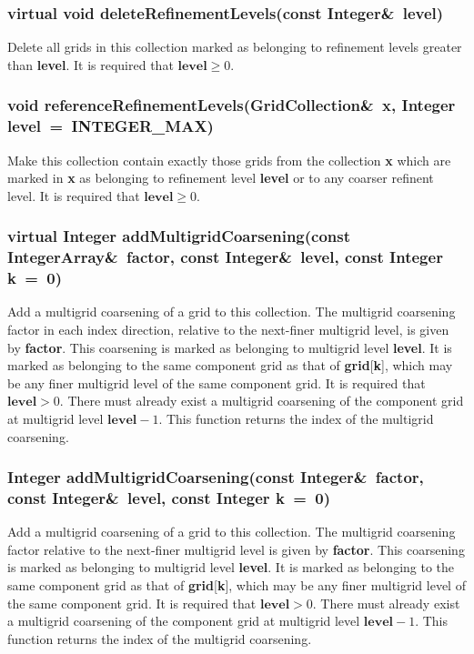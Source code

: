 \documentclass{article}
\begin{document}
  \subsubsection{virtual void deleteRefinementLevels(const Integer\&~level)}
  \label{GridCollection::deleteRefinementLevels(level)}
    Delete all grids in this collection marked as belonging to refinement levels greater than \textbf{level}.
    It is required that $\textbf{level}\ge0$.

  \subsubsection{void referenceRefinementLevels(GridCollection\&~x,  Integer level~=~INTEGER\_MAX)}
  \label{GridCollection::referenceRefinementLevels(x,level)}
    Make this collection contain exactly those grids from the collection \textbf{x} which are marked in \textbf{x}
    as belonging to refinement level \textbf{level} or to any coarser refinent level.  It is required that
    $\textbf{level}\ge0$.

  \subsubsection{virtual Integer addMultigridCoarsening(const IntegerArray\&~factor, const Integer\&~level, const Integer k~=~0)}
  \label{GridCollection::addMultigridCoarsening(array_factor,level,k)}
    Add a multigrid coarsening of a grid to this collection.
    The multigrid coarsening factor in each index direction, relative to the next-finer multigrid level, is given by \textbf{factor}.
    This coarsening is marked as belonging to multigrid level \textbf{level}.
    It is marked as belonging to the same component grid as that of \textbf{grid}[\textbf{k}], which may be any finer multigrid level
    of the same component grid.  It is required that $\textbf{level}>0$.
    There must already exist a multigrid coarsening of the component grid at multigrid level $\textbf{level}-1$.
    This function returns the index of the multigrid coarsening.

  \subsubsection{Integer addMultigridCoarsening(const Integer\&~factor, const Integer\&~level, const Integer k~=~0)}
  \label{GridCollection::addMultigridCoarsening(factor,level,k)}
    Add a multigrid coarsening of a grid to this collection.
    The multigrid coarsening factor relative to the next-finer multigrid level is given by \textbf{factor}.
    This coarsening is marked as belonging to multigrid level \textbf{level}.
    It is marked as belonging to the same component grid as that of \textbf{grid}[\textbf{k}], which may be any finer multigrid level
    of the same component grid.  It is required that $\textbf{level}>0$.
    There must already exist a multigrid coarsening of the component grid at multigrid level $\textbf{level}-1$.
    This function returns the index of the multigrid coarsening.
\end{document}
